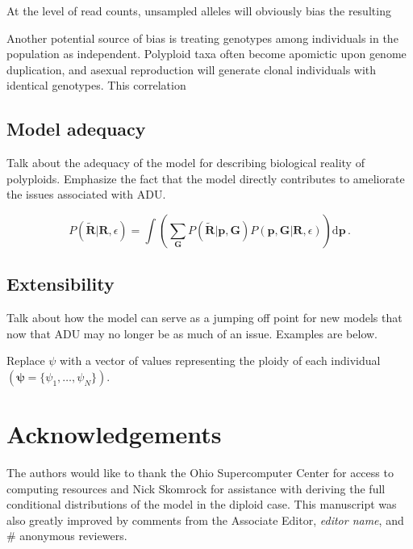 \documentclass[11pt,english,letterpaper,oneside]{article}
\begin{document}
At the level of read counts, unsampled alleles will obviously bias the resulting
\medskip

Another potential source of bias is treating genotypes among individuals in the population as independent. Polyploid taxa often become apomictic upon genome duplication, and asexual reproduction will generate clonal individuals with identical genotypes. This correlation 

\medskip
\subsection*{Model adequacy}
\medskip

Talk about the adequacy of the model for describing biological reality of polyploids. Emphasize the fact that the model directly contributes to ameliorate the issues associated with ADU.

\begin{equation}
P(\tilde{\bm{R}}|\bm{R},\epsilon) = \int \left(\displaystyle\sum_{\bm{G}} P(\tilde{\bm{R}}|\bm{p},\bm{G}) P(\bm{p},\bm{G}|\bm{R},\epsilon)\right) \text{d}\bm{p}\, .
\end{equation}

\medskip
\subsection*{Extensibility}
\medskip

Talk about how the model can serve as a jumping off point for new models that now that ADU may no longer be as much of an issue. Examples are below.
\medskip

Replace $\psi$ with a vector of values representing the ploidy of each individual $(\bm{\psi} = \{\psi_1,\ldots,\psi_N\})$.
\medskip



\section*{Acknowledgements}           %

The authors would like to thank the Ohio Supercomputer Center for access to computing resources and Nick Skomrock for assistance with deriving the full conditional distributions of the model in the diploid case. This manuscript was also greatly improved by comments from the Associate Editor, \textit{editor name}, and \# anonymous reviewers.
\medskip


\end{document}
